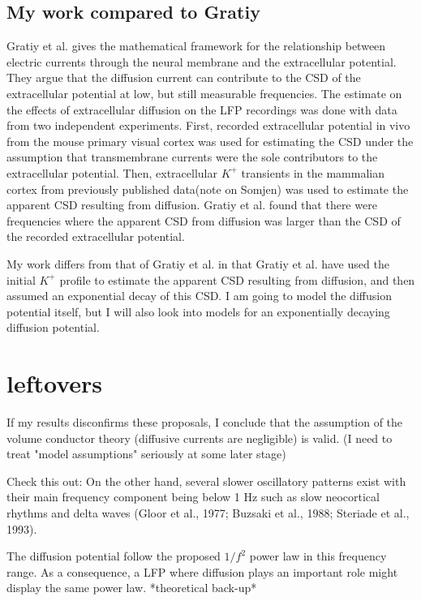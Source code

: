 \documentclass{article}
\begin{document}
\subsection{My work compared to Gratiy}


Gratiy et al.\cite{Gratiy2017} gives the mathematical framework for the relationship between electric currents through the neural membrane and the extracellular potential. They argue that the diffusion current can contribute to the CSD of the extracellular potential at low, but still measurable frequencies. The estimate on the effects of extracellular diffusion on the LFP recordings was done with data from two independent experiments. First, recorded extracellular potential in vivo from the mouse primary visual cortex was used for estimating the CSD under the assumption that transmembrane currents were the sole contributors to the extracellular potential. Then, extracellular $K^+$ transients in the mammalian cortex from previously published data(note on Somjen) was used to estimate the apparent CSD resulting from diffusion. Gratiy et al. found that there were frequencies where the apparent CSD from diffusion was larger than the CSD of the recorded extracellular potential.

 My work differs from that of Gratiy et al. in that Gratiy et al. have used the initial $K^+$ profile to estimate the apparent CSD resulting from diffusion, and then assumed an exponential decay of this CSD. I am going to model the diffusion potential itself, but I will also look into models for an exponentially decaying diffusion potential. 
\section{leftovers}

If my results disconfirms these proposals, I conclude that the assumption of the volume conductor theory (diffusive currents are negligible) is valid. 
(I need to treat "model assumptions" seriously at some later stage)

Check this out: On the
other hand, several slower oscillatory patterns exist with their main
frequency component being below 1 Hz such as slow neocortical
rhythms and delta waves (Gloor et al., 1977; Buzsaki et al., 1988;
Steriade et al., 1993).

The diffusion potential follow the proposed  $1/f^2$ power law in this frequency range. As a consequence, a LFP where diffusion plays an important role might display the same power law.  *theoretical back-up*
\end{document}
